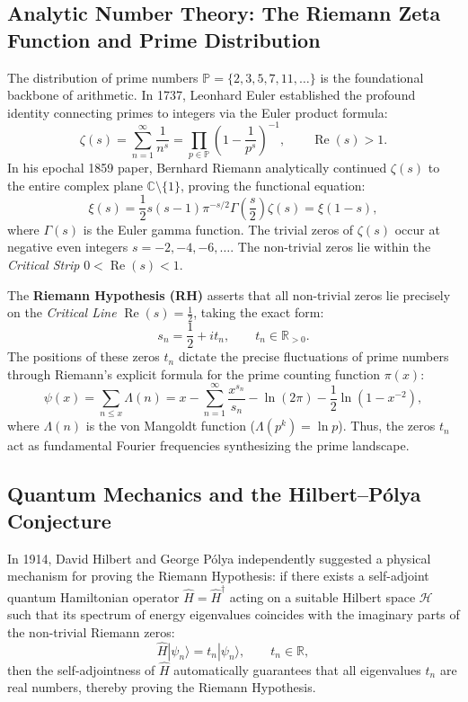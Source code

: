 \documentclass[11pt,a4paper]{article}
\begin{document}
\subsection{Analytic Number Theory: The Riemann Zeta Function and Prime Distribution}
The distribution of prime numbers $\mathbb{P} = \{2, 3, 5, 7, 11, \dots\}$ is the foundational backbone of arithmetic. In 1737, Leonhard Euler established the profound identity connecting primes to integers via the Euler product formula:
\begin{equation}
\zeta(s) = \sum_{n=1}^\infty \frac{1}{n^s} = \prod_{p \in \mathbb{P}} \left( 1 - \frac{1}{p^s} \right)^{-1}, \qquad \operatorname{Re}(s) > 1.
\end{equation}
In his epochal 1859 paper, Bernhard Riemann analytically continued $\zeta(s)$ to the entire complex plane $\mathbb{C} \setminus \{1\}$, proving the functional equation:
\begin{equation}
\xi(s) = \frac{1}{2} s (s - 1) \pi^{-s/2} \Gamma\left(\frac{s}{2}\right) \zeta(s) = \xi(1 - s),
\end{equation}
where $\Gamma(s)$ is the Euler gamma function. The trivial zeros of $\zeta(s)$ occur at negative even integers $s = -2, -4, -6, \dots$. The non-trivial zeros lie within the \emph{Critical Strip} $0 < \operatorname{Re}(s) < 1$. 

The \textbf{Riemann Hypothesis (RH)} asserts that all non-trivial zeros lie precisely on the \emph{Critical Line} $\operatorname{Re}(s) = \frac{1}{2}$, taking the exact form:
\begin{equation}
s_n = \frac{1}{2} + i t_n, \qquad t_n \in \mathbb{R}_{>0}.
\end{equation}
The positions of these zeros $t_n$ dictate the precise fluctuations of prime numbers through Riemann's explicit formula for the prime counting function $\pi(x)$:
\begin{equation}
\psi(x) = \sum_{n \le x} \Lambda(n) = x - \sum_{n=1}^\infty \frac{x^{s_n}}{s_n} - \ln(2\pi) - \frac{1}{2} \ln(1 - x^{-2}),
\end{equation}
where $\Lambda(n)$ is the von Mangoldt function ($\Lambda(p^k) = \ln p$). Thus, the zeros $t_n$ act as fundamental Fourier frequencies synthesizing the prime landscape.

\subsection{Quantum Mechanics and the Hilbert--P\'olya Conjecture}
In 1914, David Hilbert and George P\'olya independently suggested a physical mechanism for proving the Riemann Hypothesis: if there exists a self-adjoint quantum Hamiltonian operator $\hat{H} = \hat{H}^\dagger$ acting on a suitable Hilbert space $\mathcal{H}$ such that its spectrum of energy eigenvalues coincides with the imaginary parts of the non-trivial Riemann zeros:
\begin{equation}
\hat{H} |\psi_n\rangle = t_n |\psi_n\rangle, \qquad t_n \in \mathbb{R},
\end{equation}
then the self-adjointness of $\hat{H}$ automatically guarantees that all eigenvalues $t_n$ are real numbers, thereby proving the Riemann Hypothesis.
\end{document}
